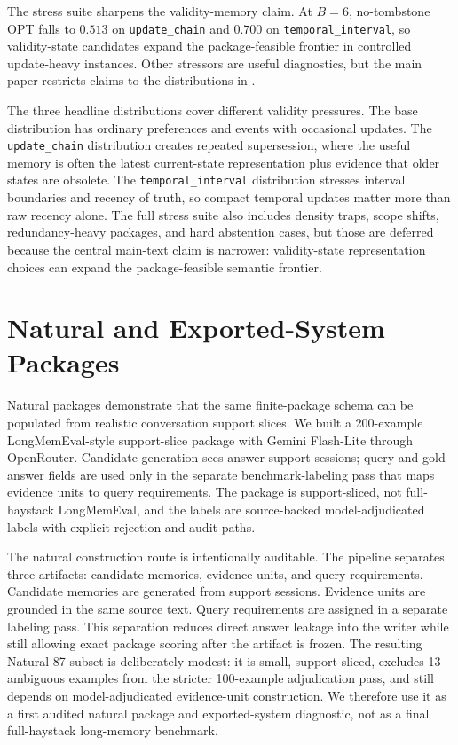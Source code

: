 \documentclass{article}
\theoremstyle{remark}
\theoremstyle{plain}
\begin{document}
The stress suite sharpens the validity-memory claim. At $B=6$, no-tombstone OPT falls to $0.513$ on \texttt{update\_chain} and $0.700$ on \texttt{temporal\_interval}, so validity-state candidates expand the package-feasible frontier in controlled update-heavy instances. Other stressors are useful diagnostics, but the main paper restricts claims to the distributions in .

The three headline distributions cover different validity pressures. The base distribution has ordinary preferences and events with occasional updates. The \texttt{update\_chain} distribution creates repeated supersession, where the useful memory is often the latest current-state representation plus evidence that older states are obsolete. The \texttt{temporal\_interval} distribution stresses interval boundaries and recency of truth, so compact temporal updates matter more than raw recency alone. The full stress suite also includes density traps, scope shifts, redundancy-heavy packages, and hard abstention cases, but those are deferred because the central main-text claim is narrower: validity-state representation choices can expand the package-feasible semantic frontier.

\section{Natural and Exported-System Packages}\label{sec:natural}

Natural packages demonstrate that the same finite-package schema can be populated from realistic conversation support slices. We built a 200-example LongMemEval-style support-slice package with Gemini Flash-Lite through OpenRouter. Candidate generation sees answer-support sessions; query and gold-answer fields are used only in the separate benchmark-labeling pass that maps evidence units to query requirements. The package is support-sliced, not full-haystack LongMemEval, and the labels are source-backed model-adjudicated labels with explicit rejection and audit paths.

The natural construction route is intentionally auditable. The pipeline separates three artifacts: candidate memories, evidence units, and query requirements. Candidate memories are generated from support sessions. Evidence units are grounded in the same source text. Query requirements are assigned in a separate labeling pass. This separation reduces direct answer leakage into the writer while still allowing exact package scoring after the artifact is frozen. The resulting Natural-87 subset is deliberately modest: it is small, support-sliced, excludes 13 ambiguous examples from the stricter 100-example adjudication pass, and still depends on model-adjudicated evidence-unit construction. We therefore use it as a first audited natural package and exported-system diagnostic, not as a final full-haystack long-memory benchmark.
\end{document}
